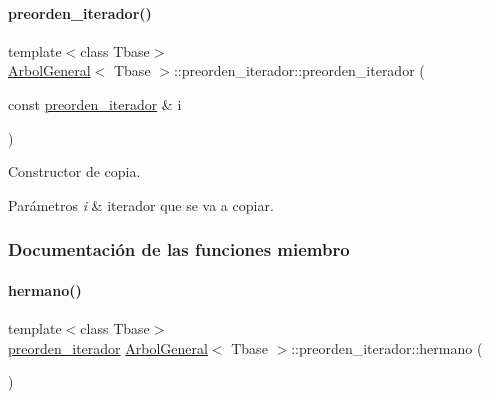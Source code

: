 \paragraph{\texorpdfstring{preorden\+\_\+iterador()}{preorden\_iterador()}\hspace{0.1cm}{\footnotesize\ttfamily [3/3]}}
{\footnotesize\ttfamily template$<$class Tbase$>$ \\
\hyperlink{classArbolGeneral}{Arbol\+General}$<$ Tbase $>$\+::preorden\+\_\+iterador\+::preorden\+\_\+iterador (\begin{DoxyParamCaption}\item[{const \hyperlink{classArbolGeneral_1_1preorden__iterador}{preorden\+\_\+iterador} \&}]{i }\end{DoxyParamCaption})\hspace{0.3cm}{\ttfamily [inline]}}



Constructor de copia. 


\begin{DoxyParams}{Parámetros}
{\em i} & iterador que se va a copiar. \\
\hline
\end{DoxyParams}


\subsubsection{Documentación de las funciones miembro}
\hypertarget{classArbolGeneral_1_1preorden__iterador_ae112223697d9ffc1cdb9454436a8acd1}{}\label{classArbolGeneral_1_1preorden__iterador_ae112223697d9ffc1cdb9454436a8acd1} 
\paragraph{\texorpdfstring{hermano()}{hermano()}}
{\footnotesize\ttfamily template$<$class Tbase$>$ \\
\hyperlink{classArbolGeneral_1_1preorden__iterador}{preorden\+\_\+iterador} \hyperlink{classArbolGeneral}{Arbol\+General}$<$ Tbase $>$\+::preorden\+\_\+iterador\+::hermano (\begin{DoxyParamCaption}{ }\end{DoxyParamCaption})\hspace{0.3cm}{\ttfamily [inline]}}



